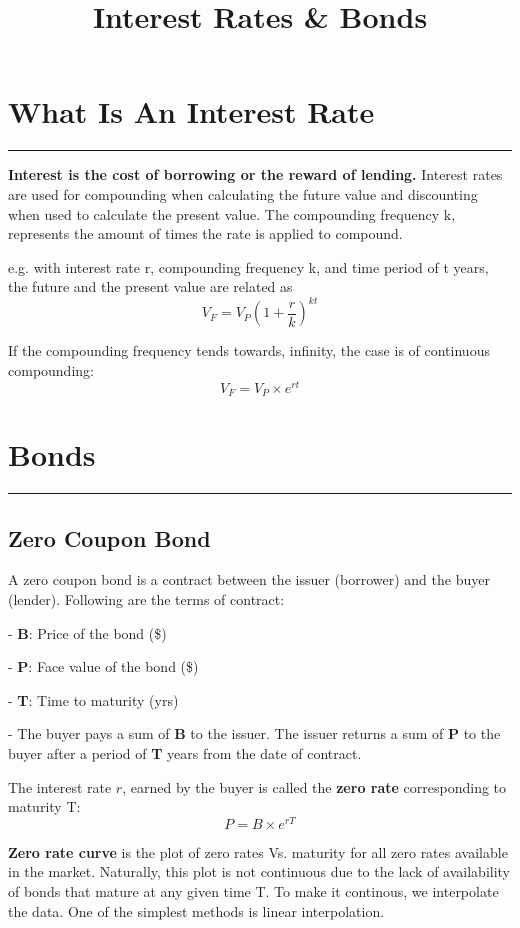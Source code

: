 \documentclass[DIV=15, fleqn, oneside, 10pt]{scrartcl}
\title{Interest Rates \& Bonds}
\date{}                    %
\theoremstyle{clean}
\newcommand{\sep}{%
  \par\medskip
  \hrule
  \bigskip
}
\begin{document}
\maketitle

\newpage

\section*{What Is An Interest Rate}
\sep
\textbf{Interest is the cost of borrowing or the reward of lending.} Interest rates are used for compounding
when calculating the future value and discounting when used to calculate the present value. The
compounding frequency k, represents the amount of times the rate is applied to compound.

e.g. with interest rate r, compounding frequency k, and time period of t years,
the future and the present value are related
as
\[
V_{F} = V_{P} (1 + \frac{r}{k})^{kt}
\]

If the compounding frequency tends towards, infinity, the case is of continuous compounding:
\[
V_{F} = V_{P} \times e^{rt}
\]

\section*{Bonds}
\sep
\subsection*{Zero Coupon Bond}
A zero coupon bond is a contract between the issuer (borrower) and the buyer (lender). Following
are the terms of contract:

 - \textbf{B}: Price of the bond (\$)

 - \textbf{P}: Face value of the bond (\$)

 - \textbf{T}: Time to maturity (yrs)

 - The buyer pays a sum of \textbf{B} to the issuer. The issuer returns a sum of \textbf{P} to
    the buyer after a period of \textbf{T} years from the date of contract.

The interest rate $r$, earned by the buyer is called the \textbf{zero rate} corresponding
to maturity T:
\[
P = B \times e^{rT}
\]

\textbf{Zero rate curve} is the plot of zero rates Vs. maturity for all zero rates available in the
market. Naturally, this plot is not continuous due to the lack of availability of bonds that mature
at any given time T. To make it continous, we interpolate the data. One of the simplest methods is
linear interpolation.
\end{document}

